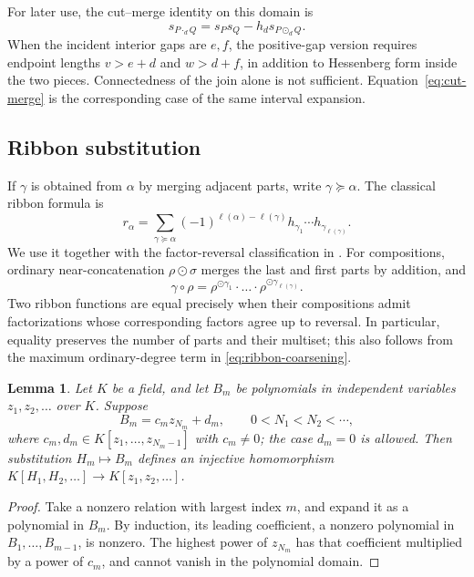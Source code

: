 \documentclass[11pt,a4paper]{amsart}
\numberwithin{equation}{section}
\theoremstyle{plain}
\newtheorem{lemma}[theorem]{Lemma}
\theoremstyle{definition}
\begin{document}
For later use, the cut--merge identity on this domain is
\begin{equation}\label{eq:cut-merge}
 s_{P\cdot_d Q}=s_Ps_Q-h_ds_{P\odot_d Q}.
\end{equation}
When the incident interior gaps are \(e,f\), the positive-gap version
requires endpoint lengths \(v>e+d\) and \(w>d+f\), in addition to
Hessenberg form inside the two pieces.  Connectedness of the join alone
is not sufficient.  Equation~\eqref{eq:cut-merge} is the corresponding
case of the same interval expansion.

\subsection{Ribbon substitution}\label{subsec:ribbon-substitution}

If \(\gamma\) is obtained from \(\alpha\) by merging adjacent
parts, write \(\gamma\succeq\alpha\).  The classical ribbon formula is
\begin{equation}\label{eq:ribbon-coarsening}
 r_\alpha=\sum_{\gamma\succeq\alpha}
 (-1)^{\ell(\alpha)-\ell(\gamma)}
 h_{\gamma_1}\cdots h_{\gamma_{\ell(\gamma)}}.
\end{equation}
We use it together with the factor-reversal classification in
\cite{Shields2026Coarsenings}.  For compositions, ordinary
near-concatenation \(\rho\odot\sigma\) merges the last and first
parts by addition, and
\begin{equation}\label{eq:ribbon-composition}
 \gamma\circ\rho
 =\rho^{\odot\gamma_1}\cdot\ldots\cdot
   \rho^{\odot\gamma_{\ell(\gamma)}}.
\end{equation}
Two ribbon functions are equal precisely when their compositions admit
factorizations whose corresponding factors agree up to reversal.
In particular, equality preserves the number of parts and their multiset;
this also follows from the maximum ordinary-degree term in
\eqref{eq:ribbon-coarsening}.

\begin{lemma}\label{lem:triangular-substitution}
Let \(K\) be a field, and let \(B_m\) be polynomials in independent
variables \(z_1,z_2,\ldots\) over \(K\).  Suppose
\[
 B_m=c_m z_{N_m}+d_m,\qquad
 0<N_1<N_2<\cdots,
\]
where \(c_m,d_m\in K[z_1,\ldots,z_{N_m-1}]\) with \(c_m\ne0\); the
case \(d_m=0\) is allowed.  Then substitution \(H_m\mapsto B_m\) defines an
injective homomorphism \(K[H_1,H_2,\ldots]\to K[z_1,z_2,\ldots]\).
\end{lemma}

\begin{proof}
Take a nonzero relation with largest index \(m\), and expand it as a
polynomial in \(B_m\).  By induction, its leading coefficient, a
nonzero polynomial in \(B_1,\ldots,B_{m-1}\), is nonzero.  The highest
power of \(z_{N_m}\) has that coefficient multiplied by a power of
\(c_m\), and cannot vanish in the polynomial domain.
\end{proof}
\end{document}
